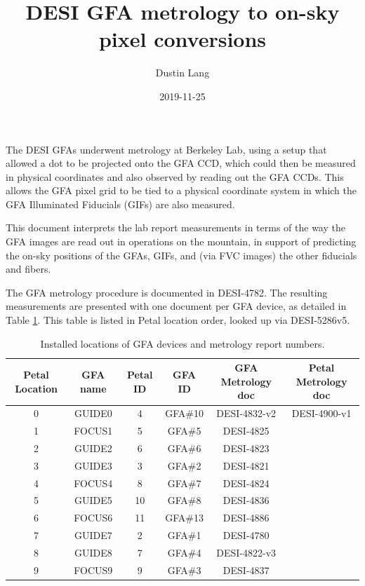 \documentclass[10pt]{article}
\title{DESI GFA metrology to on-sky pixel conversions}
\author{Dustin Lang}
\date{2019-11-25}
\begin{document}
\maketitle

The DESI GFAs underwent metrology at Berkeley Lab, using a setup that
allowed a dot to be projected onto the GFA CCD, which could then be
measured in physical coordinates and also observed by reading out the
GFA CCDs.  This allows the GFA pixel grid to be tied to a physical
coordinate system in which the GFA Illuminated Fiducials (GIFs) are
also measured.

This document interprets the lab report measurements in terms of the
way the GFA images are read out in operations on the mountain, in
support of predicting the on-sky positions of the GFAs, GIFs, and (via
FVC images) the other fiducials and fibers.

The GFA metrology procedure is documented in DESI-4782.  The resulting
measurements are presented with one document per GFA device, as
detailed in Table \ref{tab:gfareports}.  This table is listed in Petal
location order, looked up via DESI-5286v5.

\begin{table}[h!]
  \begin{center}
    \begin{tabular}{|c|c|c|c|c|c|}
      \hline
      Petal Location & GFA name & Petal ID & GFA ID & GFA Metrology doc & Petal Metrology doc \\
      \hline
      0 & GUIDE0 & 4  & GFA\#10 & DESI-4832-v2 & DESI-4900-v1 \\
      1 & FOCUS1 & 5  & GFA\#5 & DESI-4825 \\
      2 & GUIDE2 & 6  & GFA\#6 & DESI-4823 \\
      3 & GUIDE3 & 3  & GFA\#2 & DESI-4821 \\
      4 & FOCUS4 & 8  & GFA\#7 & DESI-4824 \\
      5 & GUIDE5 & 10 & GFA\#8 & DESI-4836 \\
      6 & FOCUS6 & 11 & GFA\#13 & DESI-4886 \\
      7 & GUIDE7 & 2  & GFA\#1 & DESI-4780 \\
      8 & GUIDE8 & 7  & GFA\#4 & DESI-4822-v3 \\
      9 & FOCUS9 & 9  & GFA\#3 & DESI-4837 \\
      \hline
    \end{tabular}
    \caption{\label{tab:gfareports}Installed locations of GFA devices and
      metrology report numbers.}
  \end{center}
\end{table}
\end{document}
